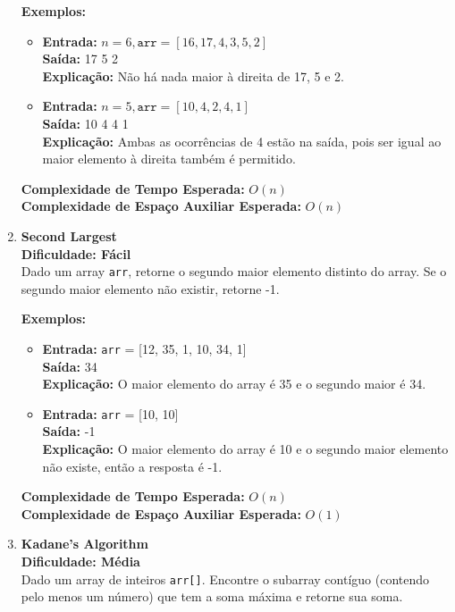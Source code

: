 \documentclass[a4paper,12pt]{article}
\begin{document}
\begin{enumerate}
    \textbf{Exemplos:}
    \begin{itemize}
        \item \textbf{Entrada:} \( n = 6, \texttt{arr} = [16,17,4,3,5,2] \) \\
        \textbf{Saída:} 17 5 2 \\
        \textbf{Explicação:} Não há nada maior à direita de 17, 5 e 2.
        
        \item \textbf{Entrada:} \( n = 5, \texttt{arr} = [10,4,2,4,1] \) \\
        \textbf{Saída:} 10 4 4 1 \\
        \textbf{Explicação:} Ambas as ocorrências de 4 estão na saída, pois ser igual ao maior elemento à direita também é permitido.
    \end{itemize}
    
    \textbf{Complexidade de Tempo Esperada:} \( O(n) \) \\
    \textbf{Complexidade de Espaço Auxiliar Esperada:} \( O(n) \)

    \item \textbf{Second Largest} \\
    \textbf{Dificuldade: Fácil} \\
    Dado um array \texttt{arr}, retorne o segundo maior elemento distinto do array. Se o segundo maior elemento não existir, retorne -1.

    \textbf{Exemplos:}
    \begin{itemize}
        \item \textbf{Entrada:} \texttt{arr} = [12, 35, 1, 10, 34, 1] \\
        \textbf{Saída:} 34 \\
        \textbf{Explicação:} O maior elemento do array é 35 e o segundo maior é 34.
        
        \item \textbf{Entrada:} \texttt{arr} = [10, 10] \\
        \textbf{Saída:} -1 \\
        \textbf{Explicação:} O maior elemento do array é 10 e o segundo maior elemento não existe, então a resposta é -1.
    \end{itemize}
    
    \textbf{Complexidade de Tempo Esperada:} \( O(n) \) \\
    \textbf{Complexidade de Espaço Auxiliar Esperada:} \( O(1) \)

    \item \textbf{Kadane's Algorithm} \\
    \textbf{Dificuldade: Média} \\
    Dado um array de inteiros \texttt{arr[]}. Encontre o subarray contíguo (contendo pelo menos um número) que tem a soma máxima e retorne sua soma.


\end{enumerate}
\end{document}
